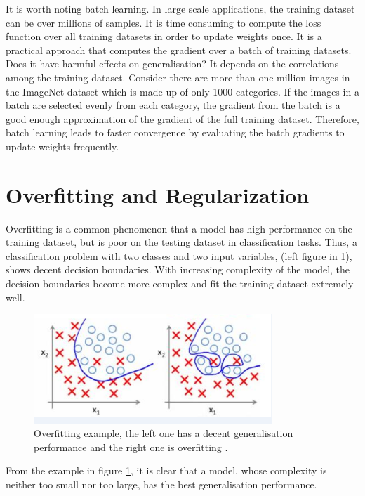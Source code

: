 It is worth noting batch learning. In large scale applications, the training dataset can be over millions of samples. It is time consuming to compute the loss function over all training datasets in order to update weights once. It is a practical approach that computes the gradient over a batch of training datasets. Does it have harmful effects on generalisation? It depends on the correlations among the training dataset. Consider there are more than one million images in the ImageNet dataset which is made up of only 1000 categories. If the images in a batch are selected evenly from each category, the gradient from the batch is a good enough approximation of the gradient of the full training dataset. Therefore, batch learning leads to faster convergence by evaluating the batch gradients to update weights frequently.

\section{Overfitting and Regularization}

Overfitting is a common phenomenon that a model has high performance on the training dataset, but is poor on the testing dataset in classification tasks. Thus, a classification problem with two classes and two input variables, (left figure in \ref{fig:OverfittingExample}), shows decent decision boundaries. With increasing complexity of the model, the decision boundaries become more complex and fit the training dataset extremely well.
\graphicspath{ {./Figures/} }
\begin{figure}[!htb]
\centering
\includegraphics[width=0.8\textwidth]{overfitting.png}
\caption{\label{fig:OverfittingExample}Overfitting example, the left one has a decent generalisation performance and the right one is overfitting \citep{OverfittingFigure}.}
\end{figure}
From the example in figure \ref{fig:OverfittingExample}, it is clear that a model, whose complexity is neither too small nor too large, has the best generalisation performance. 


